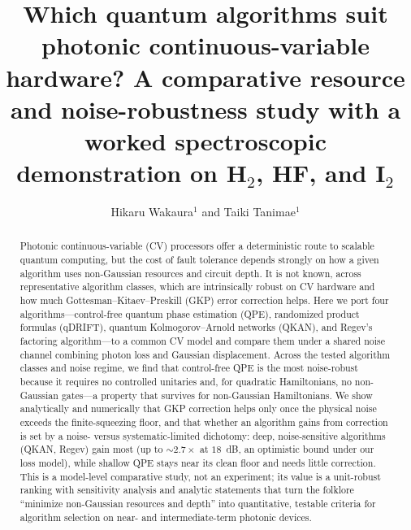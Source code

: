 \documentclass[12pt]{iopart}
\begin{document}
\title[Algorithm suitability for photonic CV hardware]{Which quantum
algorithms suit photonic continuous-variable hardware? A comparative
resource and noise-robustness study with a worked spectroscopic
demonstration on H$_2$, HF, and I$_2$}

\author{Hikaru Wakaura$^{1}$ and Taiki Tanimae$^{1}$}
\address{$^{1}$ QIRI (Quantum Integrated Research Institute Inc.),
1--16--3 Akasaka, Minato-ku, Tokyo 107--0061, Japan}

\begin{abstract}
Photonic continuous-variable (CV) processors offer a deterministic route
to scalable quantum computing, but the cost of fault tolerance depends
strongly on how a given algorithm uses non-Gaussian resources and circuit
depth. It is not known, across representative algorithm classes, which are
intrinsically robust on CV hardware and how much Gottesman--Kitaev--Preskill
(GKP) error correction helps. Here we port four algorithms---control-free
quantum phase estimation (QPE), randomized product formulas (qDRIFT), quantum
Kolmogorov--Arnold networks (QKAN), and Regev's factoring algorithm---to a
common CV model and compare them under a shared noise channel combining
photon loss and Gaussian displacement. Across the tested algorithm classes and
noise regime, we find that control-free QPE is the most noise-robust because it
requires no controlled unitaries and, for quadratic Hamiltonians, no
non-Gaussian gates---a property that survives for non-Gaussian Hamiltonians. We
show analytically and numerically that GKP correction helps only once the
physical noise exceeds the finite-squeezing floor, and that whether an
algorithm gains from correction is set by a noise- versus systematic-limited
dichotomy: deep, noise-sensitive algorithms (QKAN, Regev) gain most (up to
$\sim\!2.7\times$ at $18$~dB, an optimistic bound under our loss model), while
shallow QPE stays near its clean floor and needs little correction. This is a
model-level comparative study, not an experiment; its value is a unit-robust
ranking with sensitivity analysis and analytic statements that turn the
folklore ``minimize non-Gaussian resources and depth'' into quantitative,
testable criteria for algorithm selection on near- and intermediate-term
photonic devices.
\end{abstract}

\maketitle
\end{document}
